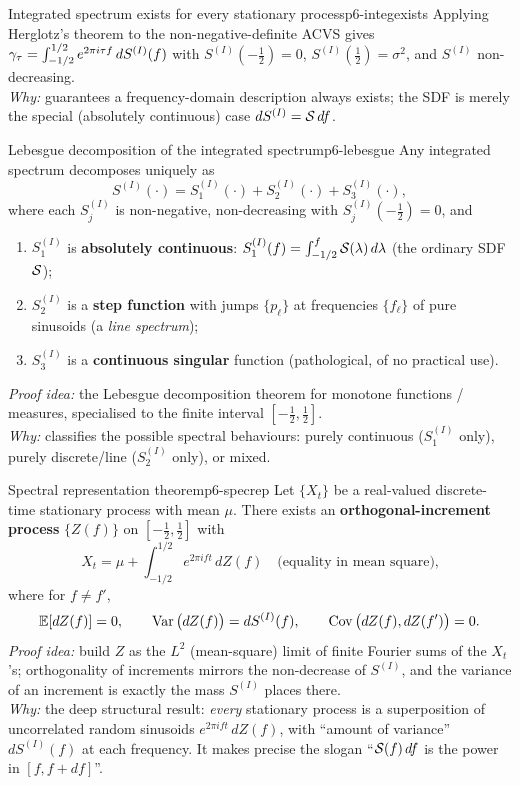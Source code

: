 \begin{corollary}{Integrated spectrum exists for every stationary process}{p6-integexists}
Applying Herglotz's theorem to the non-negative-definite ACVS gives
$\gamma_\tau=\int_{-1/2}^{1/2}e^{2\pi i \tau f}\,dS^{(I)}(f)$ with
$S^{(I)}(-\tfrac12)=0$, $S^{(I)}(\tfrac12)=\sigma^2$, and $S^{(I)}$
non-decreasing.\\[2pt]
\textit{Why:} guarantees a frequency-domain description always exists; the SDF
is merely the special (absolutely continuous) case $dS^{(I)}=\mathcal{S}\,df$.
\end{corollary}

\begin{theorem}{Lebesgue decomposition of the integrated spectrum}{p6-lebesgue}
Any integrated spectrum decomposes uniquely as
\[
S^{(I)}(\cdot)=S^{(I)}_1(\cdot)+S^{(I)}_2(\cdot)+S^{(I)}_3(\cdot),
\]
where each $S^{(I)}_j$ is non-negative, non-decreasing with
$S^{(I)}_j(-\tfrac12)=0$, and
\begin{enumerate}
  \item $S^{(I)}_1$ is \textbf{absolutely continuous}:
        $S^{(I)}_1(f)=\int_{-1/2}^{f}\mathcal{S}(\lambda)\,d\lambda$ (the ordinary SDF
        $\mathcal{S}$);
  \item $S^{(I)}_2$ is a \textbf{step function} with jumps $\{p_\ell\}$ at
        frequencies $\{f_\ell\}$ of pure sinusoids (a \emph{line spectrum});
  \item $S^{(I)}_3$ is a \textbf{continuous singular} function (pathological,
        of no practical use).
\end{enumerate}
\textit{Proof idea:} the Lebesgue decomposition theorem for monotone functions
/ measures, specialised to the finite interval $[-\tfrac12,\tfrac12]$.\\
\textit{Why:} classifies the possible spectral behaviours: purely continuous
($S^{(I)}_1$ only), purely discrete/line ($S^{(I)}_2$ only), or mixed.
\end{theorem}

\begin{theorem}{Spectral representation theorem}{p6-specrep}
Let $\{X_t\}$ be a real-valued discrete-time stationary process with mean
$\mu$. There exists an \textbf{orthogonal-increment process} $\{Z(f)\}$ on
$[-\tfrac12,\tfrac12]$ with
\[
X_t=\mu+\int_{-1/2}^{1/2} e^{2\pi i f t}\,dZ(f)
\quad\text{(equality in mean square),}
\]
where for $f\ne f'$,
\[
\mathbb{E}[dZ(f)]=0,\qquad
\operatorname{Var}\big(dZ(f)\big)=dS^{(I)}(f),\qquad
\operatorname{Cov}\big(dZ(f),dZ(f')\big)=0 .
\]
\textit{Proof idea:} build $Z$ as the $L^2$ (mean-square) limit of finite
Fourier sums of the $X_t$'s; orthogonality of increments mirrors the
non-decrease of $S^{(I)}$, and the variance of an increment is exactly the mass
$S^{(I)}$ places there.\\
\textit{Why:} the deep structural result: \emph{every} stationary process is a
superposition of uncorrelated random sinusoids $e^{2\pi i f t}\,dZ(f)$, with
``amount of variance'' $dS^{(I)}(f)$ at each frequency. It makes precise the
slogan ``$\mathcal{S}(f)\,df$ is the power in $[f,f+df]$''.
\end{theorem}

